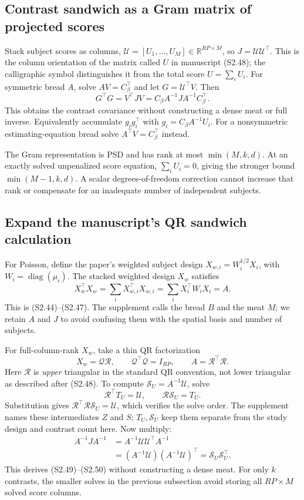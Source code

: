 \documentclass[11pt,a4paper]{article}
\newcommand{\R}{\mathbb R}
\newcommand{\diag}{\operatorname{diag}}
\numberwithin{equation}{section}
\begin{document}
\subsection{Contrast sandwich as a Gram matrix of projected scores}
Stack subject scores as columns,
$\mathcal U=[U_1,\ldots,U_M]\in\R^{RP\times M}$,
so $J=\mathcal U\mathcal U^\top$.
This is the column orientation of the matrix called $U$ in
manuscript (S2.48); the calligraphic symbol distinguishes it from
the total score $U=\sum_iU_i$.
For symmetric bread $A$, solve $AV=C_\beta^\top$ and let
$G=\mathcal U^\top V$.
Then
\[
 G^\top G
 =V^\top J V
 =C_\beta A^{-1}JA^{-1}C_\beta^\top.
\]
This obtains the contrast covariance without constructing a dense meat
or full inverse. Equivalently accumulate $g_i g_i^\top$ with
$g_i=C_\beta A^{-1}U_i$.
For a nonsymmetric estimating-equation bread solve
$A^\top V=C_\beta^\top$ instead.

The Gram representation is PSD and has rank at most $\min(M,k,d)$.
At an exactly solved unpenalized score equation,
$\sum_iU_i=0$, giving the stronger bound $\min(M-1,k,d)$.
A scalar degrees-of-freedom correction cannot increase that rank
or compensate for an inadequate number of independent subjects.

\subsection{Expand the manuscript's QR sandwich calculation}
For Poisson, define the paper's weighted subject design
$X_{w,i}=W_i^{1/2}X_i$, with $W_i=\diag(\mu_i)$.
The stacked weighted design $X_w$ satisfies
\[
 X_w^\top X_w=\sum_iX_{w,i}^\top X_{w,i}
            =\sum_iX_i^\top W_iX_i=A.
\]
This is (S2.44)--(S2.47). The supplement calls the bread $B$
and the meat $M$; we retain $A$ and $J$ to avoid confusing
them with the spatial basis and number of subjects.

For full-column-rank $X_w$, take a thin QR factorization
\[
 X_w=\mathcal Q\mathcal R,\qquad
 \mathcal Q^\top\mathcal Q=I_{RP},\qquad
 A=\mathcal R^\top\mathcal R .
\]
Here $\mathcal R$ is \emph{upper} triangular in the standard QR
convention, not lower triangular as described after (S2.48).
To compute $\mathcal S_U=A^{-1}\mathcal U$, solve
\[
 \mathcal R^\top T_U=\mathcal U,\qquad
 \mathcal R\mathcal S_U=T_U.
\]
Substitution gives
$\mathcal R^\top\mathcal R\mathcal S_U=\mathcal U$,
which verifies the solve order. The supplement names these
intermediates $Z$ and $S$; $T_U,\mathcal S_U$ keep them separate
from the study design and contrast count here.
Now multiply:
\begin{align}
 A^{-1}JA^{-1}
 &=A^{-1}\mathcal U\mathcal U^\top A^{-1}\\
 &=(A^{-1}\mathcal U)(A^{-1}\mathcal U)^\top
   =\mathcal S_U\mathcal S_U^\top.
 \label{lesion-qr-sandwich}
\end{align}
This derives (S2.49)--(S2.50) without constructing a dense meat.
For only $k$ contrasts, the smaller solves in the previous
subsection avoid storing all $RP\times M$ solved score columns.
\end{document}

